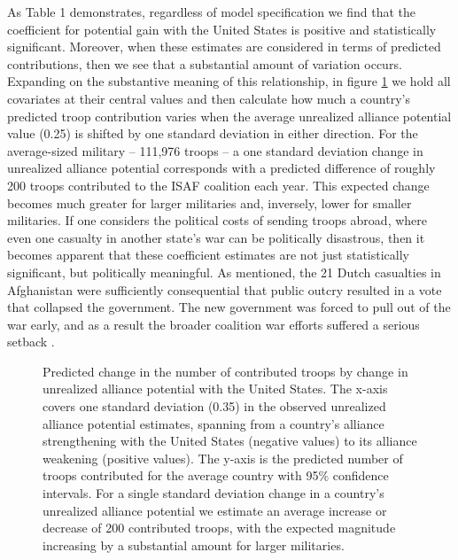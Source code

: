 \documentclass[12pt,letterpaper]{article}
\begin{document}
		As Table 1 demonstrates, regardless of model specification we find that the coefficient for potential gain with the United States is positive and statistically significant. Moreover, when these estimates are considered in terms of predicted contributions, then we see that a substantial amount of variation occurs. Expanding on the substantive meaning of this relationship, in figure \ref{fig:predict} we hold all covariates at their central values and then calculate how much a country's predicted troop contribution varies when the average unrealized alliance potential value (0.25) is shifted by one standard deviation in either direction. For the average-sized military -- 111,976 troops -- a one standard deviation change in unrealized alliance potential corresponds with a predicted difference of roughly 200 troops contributed to the ISAF coalition each year. This expected change becomes much greater for larger militaries and, inversely, lower for smaller militaries. If one considers the political costs of sending troops abroad, where even one casualty in another state's war can be politically disastrous, then it becomes apparent that these coefficient estimates are not just statistically significant, but politically meaningful. As mentioned, the 21 Dutch casualties in Afghanistan were sufficiently consequential that public outcry resulted in a vote that collapsed the government. The new government was forced to pull out of the war early, and as a result the broader coalition war efforts suffered a serious setback \citep[95-100]{massie_whydemocraticallies_2016}.

		\begin{figure}[p!]
			\centering
			\resizebox{1.05\linewidth}{!}{
				
			}
			\caption{Predicted change in the number of contributed troops by change in unrealized alliance potential with the United States. The x-axis covers one standard deviation (0.35) in the observed unrealized alliance potential estimates, spanning from a country's alliance strengthening with the United States (negative values) to its alliance weakening (positive values). The y-axis is the predicted number of troops contributed for the average country with 95\% confidence intervals. For a single standard deviation change in a country's unrealized alliance potential we estimate an average increase or decrease of 200 contributed troops, with the expected magnitude increasing by a substantial amount for larger militaries.}
			\label{fig:predict}
		\end{figure}
\end{document}
